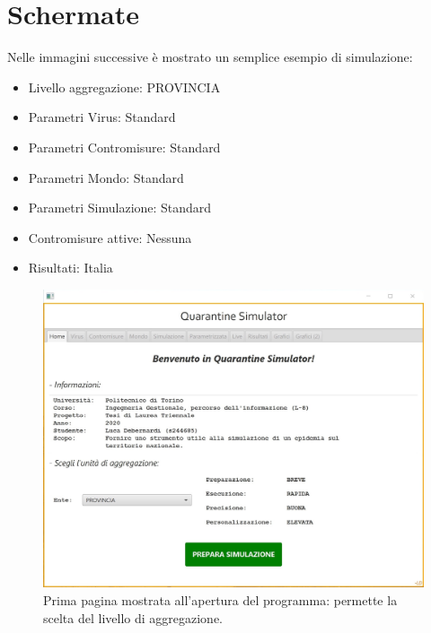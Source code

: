 \documentclass[a4paper, 12pt]{article}
\begin{document}
	
\newpage

\section{Schermate}
	Nelle immagini successive è mostrato un semplice esempio di simulazione:
	\begin{itemize}
		\item Livello aggregazione: \hfill PROVINCIA \hspace{0.5cm} $\text{}$
		\item Parametri Virus: \hfill Standard \hspace{0.5cm} $\text{}$
		\item Parametri Contromisure: \hfill Standard \hspace{0.5cm} $\text{}$
		\item Parametri Mondo: \hfill Standard \hspace{0.5cm} $\text{}$
		\item Parametri Simulazione: \hfill Standard \hspace{0.5cm} $\text{}$
		\item Contromisure attive: \hfill Nessuna \hspace{0.5cm} $\text{}$
		\item Risultati: \hfill Italia \hspace{0.5cm} $\text{}$
	\end{itemize}
	
	
\begin{figure}[H]
	\centering
	\includegraphics[height=0.4\textheight]{IMG/1.jpg}
	\caption[App: Tab Home]{Prima pagina mostrata all'apertura del programma: permette la scelta del livello di aggregazione.}
	\label{fig:screen1}
\end{figure}
\end{document}
